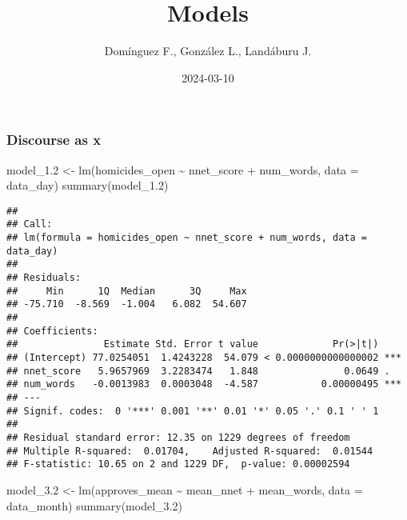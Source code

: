 \documentclass[
]{article}
\title{Models}
\author{Domínguez F., González L., Landáburu J.}
\date{2024-03-10}
\newenvironment{Shaded}{\begin{snugshade}}{\end{snugshade}}
\newcommand{\AttributeTok}[1]{\textcolor[rgb]{0.77,0.63,0.00}{#1}}
\newcommand{\FloatTok}[1]{\textcolor[rgb]{0.00,0.00,0.81}{#1}}
\newcommand{\FunctionTok}[1]{\textcolor[rgb]{0.00,0.00,0.00}{#1}}
\newcommand{\NormalTok}[1]{#1}
\newcommand{\OtherTok}[1]{\textcolor[rgb]{0.56,0.35,0.01}{#1}}
\newcommand{\SpecialCharTok}[1]{\textcolor[rgb]{0.00,0.00,0.00}{#1}}
\begin{document}
\maketitle

\hypertarget{discourse-as-x}{%
\subsubsection{Discourse as x}\label{discourse-as-x}}

\begin{Shaded}
\begin{Highlighting}[]
\NormalTok{model\_1}\FloatTok{.2} \OtherTok{\textless{}{-}} \FunctionTok{lm}\NormalTok{(homicides\_open }\SpecialCharTok{\textasciitilde{}}\NormalTok{ nnet\_score }\SpecialCharTok{+}\NormalTok{ num\_words, }\AttributeTok{data =}\NormalTok{ data\_day)}
\FunctionTok{summary}\NormalTok{(model\_1}\FloatTok{.2}\NormalTok{)}
\end{Highlighting}
\end{Shaded}

\begin{verbatim}
## 
## Call:
## lm(formula = homicides_open ~ nnet_score + num_words, data = data_day)
## 
## Residuals:
##     Min      1Q  Median      3Q     Max 
## -75.710  -8.569  -1.004   6.082  54.607 
## 
## Coefficients:
##               Estimate Std. Error t value             Pr(>|t|)    
## (Intercept) 77.0254051  1.4243228  54.079 < 0.0000000000000002 ***
## nnet_score   5.9657969  3.2283474   1.848               0.0649 .  
## num_words   -0.0013983  0.0003048  -4.587           0.00000495 ***
## ---
## Signif. codes:  0 '***' 0.001 '**' 0.01 '*' 0.05 '.' 0.1 ' ' 1
## 
## Residual standard error: 12.35 on 1229 degrees of freedom
## Multiple R-squared:  0.01704,    Adjusted R-squared:  0.01544 
## F-statistic: 10.65 on 2 and 1229 DF,  p-value: 0.00002594
\end{verbatim}

\begin{Shaded}
\begin{Highlighting}[]
\NormalTok{model\_3}\FloatTok{.2} \OtherTok{\textless{}{-}} \FunctionTok{lm}\NormalTok{(approves\_mean }\SpecialCharTok{\textasciitilde{}}\NormalTok{ mean\_nnet }\SpecialCharTok{+}\NormalTok{ mean\_words, }\AttributeTok{data =}\NormalTok{ data\_month)}
\FunctionTok{summary}\NormalTok{(model\_3}\FloatTok{.2}\NormalTok{)}
\end{Highlighting}
\end{Shaded}
\end{document}
